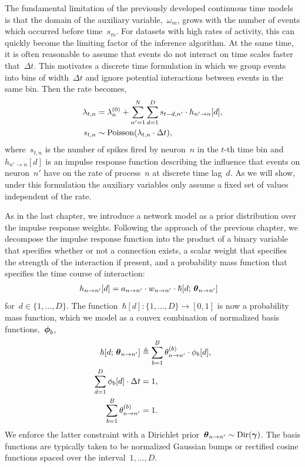 The fundamental limitation of the previously developed continuous time
models is that the domain of the auxiliary
variable,~$\omega_m$, grows with the number of events which
occurred before time~$s_{m}$. For datasets with high rates of
activity, this can quickly become the limiting factor of the inference
algorithm.  At the same time, it is often reasonable to assume that
events do not interact on time scales faster that~$\Delta t$. This
motivates a discrete time formulation in which we group events into bins
of width~$\Delta t$ and ignore potential interactions between events
in the same bin. Then the rate becomes,
\begin{align}
\label{eq:disc_hawkes_rate}
\lambda_{t,n} &= \lambda_n^{(0)} +
\sum_{n' = 1}^N \sum_{d=1}^{D} s_{t-d,n'} \cdot h_{n' \to n}[d], \\
\nonumber
s_{t,n} &\sim \mathrm{Poisson}(\lambda_{t,n} \cdot \Delta t),
\end{align}
where~$s_{t,n}$ is the number of spikes fired by neuron~$n$ in the
$t$-th time bin and~${h_{n' \to n}[d]}$ is an impulse response
function describing the influence that events on neuron~$n'$ have on
the rate of process~$n$ at discrete time lag~${d}$. As we will show,
under this formulation the auxiliary variables only assume a fixed set
of values independent of the rate.

As in the last chapter, we introduce a network model as a prior
distribution over the impulse response weights. Following the approach
of the previous chapter, we decompose the impulse response function
into the product of a binary variable that specifies whether or not a
connection exists, a scalar weight that specifies the strength of the
interaction if present, and a probability mass function that specifies
the time course of interaction:
\begin{align*}
  h_{n \to n'}[d]
  &= a_{n \to n'} \cdot w_{n \to n'} \cdot \hbar[d; \, \boldsymbol{\theta}_{n \to n'}] 
\end{align*}
for~${d \in\{1,\ldots,D\}}$.  
The function~${\hbar[d]: \{1, \ldots, D\} \to
  [0,1]}$ is now a probability mass function, which we model as a convex
combination of normalized basis functions,~$\boldsymbol{\phi}_b$,
\begin{align*}
  \hbar[d; \, \boldsymbol{\theta}_{n \to n'}]
  &\triangleq \sum_{b=1}^B \theta_{n \to n'}^{(b)} \cdot \phi_b[d], \\
  \sum_{d=1}^D \phi_b[d] \cdot \Delta t  &= 1, \\
  \sum_{b=1}^B \theta_{n \to n'}^{(b)} &= 1.
\end{align*}
We enforce the latter constraint with a Dirichlet
prior~${\boldsymbol{\theta}_{n \to n'} \sim \mathrm{Dir}(\boldsymbol{\gamma})}$.
The basis functions are typically taken to be normalized Gaussian bumps or
rectified cosine functions spaced over the interval~${1,\ldots,D}$.

